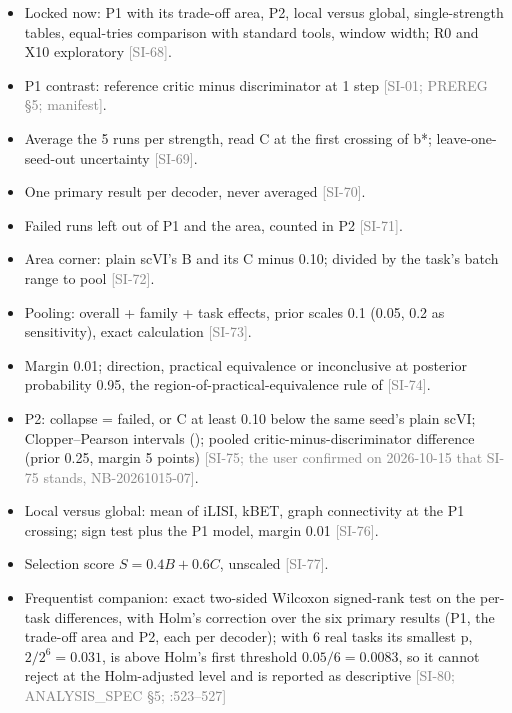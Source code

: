 \documentclass[11pt]{article}
\newcommand{\src}[1]{{\scriptsize\textcolor{gray}{[#1]}}}
\begin{document}
\begin{itemize}
\item Locked now: P1 with its trade-off area, P2, local versus global, single-strength tables, equal-tries comparison with standard tools, window width; R0 and X10 exploratory \src{SI-68}.
\item P1 contrast: reference critic minus discriminator at 1 step \src{SI-01; PREREG \S5; manifest}.
\item Average the 5 runs per strength, read C at the first crossing of b*; leave-one-seed-out uncertainty \src{SI-69}.
\item One primary result per decoder, never averaged \src{SI-70}.
\item Failed runs left out of P1 and the area, counted in P2 \src{SI-71}.
\item Area corner: plain scVI's B and its C minus 0.10; divided by the task's batch range to pool \src{SI-72}.
\item Pooling: overall + family + task effects, prior scales 0.1 (0.05, 0.2 as sensitivity), exact calculation \src{SI-73}.
\item Margin 0.01; direction, practical equivalence or inconclusive at posterior probability 0.95, the region-of-practical-equivalence rule of \citealp{corani2017statistical} \src{SI-74}.
\item P2: collapse = failed, or C at least 0.10 below the same seed's plain scVI; Clopper--Pearson intervals (\citealp{clopper1934use}); pooled critic-minus-discriminator difference (prior 0.25, margin 5 points) \src{SI-75; the user confirmed on 2026-10-15 that SI-75 stands, NB-20261015-07}.
\item Local versus global: mean of iLISI, kBET, graph connectivity at the P1 crossing; sign test plus the P1 model, margin 0.01 \src{SI-76}.
\item Selection score $S = 0.4B + 0.6C$, unscaled \src{SI-77}.
\item Frequentist companion: exact two-sided Wilcoxon signed-rank test on the per-task differences, with Holm's correction over the six primary results (P1, the trade-off area and P2, each per decoder); with 6 real tasks its smallest p, $2/2^6 = 0.031$, is above Holm's first threshold $0.05/6 = 0.0083$, so it cannot reject at the Holm-adjusted level and is reported as descriptive \src{SI-80; ANALYSIS\_SPEC \S5; :523--527}

\end{itemize}
\end{document}
